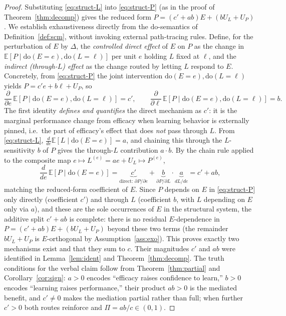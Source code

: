 \documentclass{amsart}
\theoremstyle{definition}
\begin{document}
\begin{proof}
Substituting \eqref{eq:struct-L} into \eqref{eq:struct-P} (as in the proof of
Theorem~\ref{thm:decomp}) gives the reduced form
$P=(c'+ab)E+(bU_L+U_P)$. We establish exhaustiveness directly from the
$\mathrm{do}$-semantics of Definition~\ref{def:scm}, without invoking external
path-tracing rules. Define, for the perturbation of $E$ by $\Delta$, the
\emph{controlled direct effect} of $E$ on $P$ as the change in
$\mathbb E[P\mid\mathrm{do}(E=e),\mathrm{do}(L=\ell)]$ per unit $e$ holding
$L$ fixed at $\ell$, and the \emph{indirect (through-$L$) effect} as the change
routed by letting $L$ respond to $E$. Concretely, from \eqref{eq:struct-P} the
joint intervention $\mathrm{do}(E=e),\mathrm{do}(L=\ell)$ yields
$P=c'e+b\ell+U_P$, so
\[
\frac{\partial}{\partial e}\,\mathbb E[P\mid\mathrm{do}(E=e),\mathrm{do}(L=\ell)]=c',
\qquad
\frac{\partial}{\partial \ell}\,\mathbb E[P\mid\mathrm{do}(E=e),\mathrm{do}(L=\ell)]=b .
\]
The first identity \emph{defines and quantifies} the direct mechanism as $c'$:
it is the marginal performance change from efficacy when learning behavior is
externally pinned, i.e.\ the part of efficacy's effect that does \emph{not}
pass through $L$. From \eqref{eq:struct-L}, $\frac{d}{de}\mathbb E[L\mid
\mathrm{do}(E=e)]=a$, and chaining this through the $L$-sensitivity $b$ of $P$
gives the through-$L$ contribution $a\cdot b$. By the chain rule applied to the
composite map $e\mapsto L^{(e)}=ae+U_L\mapsto P^{(e)}$,
\[
\frac{d}{de}\,\mathbb E[P\mid\mathrm{do}(E=e)]
=\underbrace{c'}_{\text{direct: }\partial P/\partial e}
+\underbrace{b}_{\partial P/\partial L}\cdot
 \underbrace{a}_{dL/de}
=c'+ab,
\]
matching the reduced-form coefficient of $E$. Since $P$ depends on $E$ in
\eqref{eq:struct-P} only directly (coefficient $c'$) and through $L$
(coefficient $b$, with $L$ depending on $E$ only via $a$), and these are the
sole occurrences of $E$ in the structural system, the additive split
$c'+ab$ is complete: there is no residual $E$-dependence in
$P=(c'+ab)E+(bU_L+U_P)$ beyond these two terms (the remainder $bU_L+U_P$ is
$E$-orthogonal by Assumption~\ref{ass:exo}). This proves exactly two mechanisms
exist and that they sum to $c$. Their magnitudes $c'$ and $ab$
were identified in Lemma~\ref{lem:ident} and Theorem~\ref{thm:decomp}. The
truth conditions for the verbal claim follow from Theorem~\ref{thm:partial} and
Corollary~\ref{cor:sign}: $a>0$ encodes ``efficacy raises confidence to learn,''
$b>0$ encodes ``learning raises performance,'' their product $ab>0$ is the
mediated benefit, and $c'\neq0$ makes the mediation partial rather than full;
when further $c'>0$ both routes reinforce and $\Pi=ab/c\in(0,1)$.
\end{proof}
\end{document}

